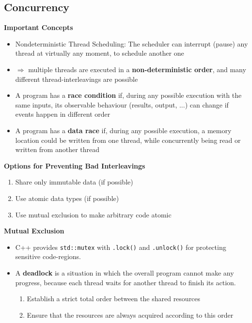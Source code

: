 \vspace{-4pt}
\begin{sectionbox}
\subsection{Concurrency}\smallskip
\textbf{Important Concepts}\par\smallskip
\begin{itemize}
    \item Nondeterministic Thread Scheduling: The scheduler can interrupt (pause) any thread at virtually any moment, to schedule another one
    \item $\Rightarrow$ multiple threads are executed in a \textbf{non-deterministic order}, and many different thread-interleavings are possible
    \item A program has a \textbf{race condition} if, during any possible execution with the same inputs, its observable behaviour (results, output, ...) can change if events happen in different order
    \item A program has a \textbf{data race} if, during any possible execution, a memory location could be written from one thread, while concurrently being read or written from another thread
\end{itemize}

\textbf{Options for Preventing Bad Interleavings}
\begin{enumerate}
    \item Share only immutable data (if possible)
    \item Use atomic data types (if possible)
    \item Use mutual exclusion to make arbitrary code atomic
\end{enumerate}
\end{sectionbox}
\vspace{-4pt}
\begin{sectionbox}
\textbf{Mutual Exclusion}
\begin{itemize}
    \item C++ provides \lstinline{std::mutex} with \lstinline{.lock()} and \lstinline{.unlock()} for protecting sensitive code-regions.
    \item A \textbf{deadlock} is a situation in which the overall program cannot make any progress, because each thread waits for another thread to finish its action.
    \begin{enumerate}
        \item Establish a strict total order between the shared resources
        \item Ensure that the resources are always acquired according to this order
    \end{enumerate}
\end{itemize}
\end{sectionbox}
